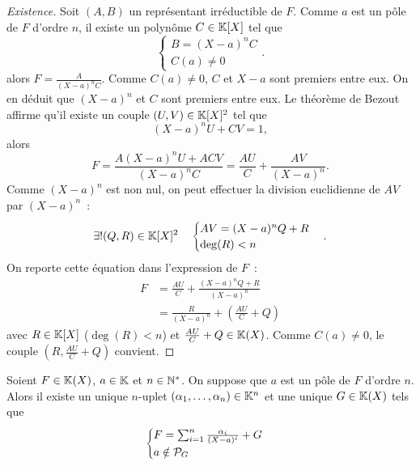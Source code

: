 \begin{proof}[Existence]
  Soit $(A,B)$ un représentant irréductible de $F$. Comme $a$ est un pôle de $F$ d'ordre $n$, il existe un polynôme $C \in \K[X]$ tel que
  \begin{equation}
    \begin{cases} B=(X-a)^nC \\ C(a) \neq 0 \end{cases}.
  \end{equation}
  alors $F=\frac{A}{(X-a)^nC}$. Comme $C(a)\neq 0$, $C$ et $X-a$ sont premiers entre eux. On en déduit que $(X-a)^n$ et $C$ sont premiers entre eux. Le théorème de Bezout affirme qu'il existe un couple $(U,V) \in \K[X]^2$ tel que
  \begin{equation}
    (X-a)^nU+CV=1,
  \end{equation}
  alors
  \begin{equation}
    F = \frac{A(X-a)^nU+ACV}{(X-a)^nC} = \frac{AU}{C} + \frac{AV}{(X-a)^n}.
  \end{equation}
  Comme $(X-a)^n$ est non nul, on peut effectuer la division euclidienne de $AV$ par $(X-a)^n$~:
  \begin{equation}
    \exists! (Q,R) \in \K[X]^2 \quad \begin{cases} AV=(X-a)^nQ+R \\ \deg(R)<n \end{cases}.
  \end{equation}
  On reporte cette équation dans l'expression de $F$~:
  \begin{align}
    F&=\frac{AU}{C} + \frac{(X-a)^nQ+R}{(X-a)^n}\\
    &=\frac{R}{(X-a)^n} + \left(\frac{AU}{C}+Q\right)
  \end{align}
  avec $R \in \K[X]$ ($\deg(R)<n$) et $\frac{AU}{C}+Q \in \K(X)$. Comme $C(a)\neq 0$, le couple $(R,\frac{AU}{C}+Q)$ convient.
\end{proof}

\begin{theo}
  Soient $F \in \K(X)$, $a \in \K$ et $n \in \N^*$. On suppose que $a$ est un pôle de $F$ d'ordre $n$. Alors il existe un unique $n$-uplet $(\alpha_1, \ldots, \alpha_n) \in \K^n$ et une unique $G \in \K(X)$ tels que
  \begin{equation}
    \begin{cases} F = \sum_{i=1}^n \frac{\alpha_i}{(X-a)^i} + G \\ a \notin \P_G \end{cases}
  \end{equation}
\end{theo}

